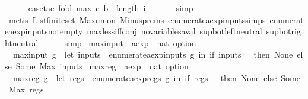 \begin{isabellebody}
\ \ \ \ \isamarkupfalse%
\ {\isacharparenleft}case{\isacharunderscore}tac\ {\isachardoublequoteopen}fold\ max\ c\ b\ {\isasymle}\ length\ i{\isachardoublequoteclose}{\isacharparenright}\isanewline
\ \ \ \ \ \isamarkupfalse%
\ simp\isanewline
\ \ \ \ \isamarkupfalse%
\ {\isacharparenleft}metis\ List{\isachardot}finite{\isacharunderscore}set\ Max{\isachardot}union\ Minus{\isachardot}prems{\isacharparenleft}{}{\isacharparenright}\ enumerate{\isacharunderscore}aexp{\isacharunderscore}inputs{\isachardot}simps{\isacharparenleft}{}{\isacharparenright}\ enumerate{\isacharunderscore}aexp{\isacharunderscore}inputs{\isacharunderscore}not{\isacharunderscore}empty\ max{\isacharunderscore}less{\isacharunderscore}iff{\isacharunderscore}conj\ no{\isacharunderscore}variables{\isacharunderscore}aval\ sup{\isacharunderscore}bot{\isachardot}left{\isacharunderscore}neutral\ sup{\isacharunderscore}bot{\isachardot}right{\isacharunderscore}neutral{\isacharparenright}\isanewline
\ \ \ \ \isamarkupfalse%
\ simp\isanewline
{}\isamarkupfalse%
%
\endisatagproof
{\isafoldproof}%
%
\isadelimproof
\isanewline
%
\endisadelimproof
\isanewline
{}\isamarkupfalse%
\ max{\isacharunderscore}input\ {\isacharcolon}{\isacharcolon}\ {\isachardoublequoteopen}aexp\ {\isasymRightarrow}\ nat\ option{\isachardoublequoteclose}\ \isanewline
\ \ {\isachardoublequoteopen}max{\isacharunderscore}input\ g\ {\isacharequal}\ {\isacharparenleft}let\ inputs\ {\isacharequal}\ {\isacharparenleft}enumerate{\isacharunderscore}aexp{\isacharunderscore}inputs\ g{\isacharparenright}\ in\ if\ inputs\ {\isacharequal}\ {\isacharbraceleft}{\isacharbraceright}\ then\ None\ else\ Some\ {\isacharparenleft}Max\ inputs{\isacharparenright}{\isacharparenright}{\isachardoublequoteclose}\isanewline
\isanewline
{}\isamarkupfalse%
\ max{\isacharunderscore}reg\ {\isacharcolon}{\isacharcolon}\ {\isachardoublequoteopen}aexp\ {\isasymRightarrow}\ nat\ option{\isachardoublequoteclose}\ \isanewline
\ \ {\isachardoublequoteopen}max{\isacharunderscore}reg\ g\ {\isacharequal}\ {\isacharparenleft}let\ regs\ {\isacharequal}\ {\isacharparenleft}enumerate{\isacharunderscore}aexp{\isacharunderscore}regs\ g{\isacharparenright}\ in\ if\ regs\ {\isacharequal}\ {\isacharbraceleft}{\isacharbraceright}\ then\ None\ else\ Some\ {\isacharparenleft}Max\ regs{\isacharparenright}{\isacharparenright}{\isachardoublequoteclose}\isanewline
\isanewline
{}\isamarkupfalse%

\end{isabellebody}
